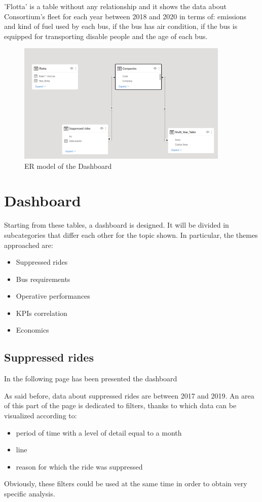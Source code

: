 'Flotta' is a table without any relationship and it shows the data about Consortium's fleet for each year between 2018 and 2020 in terms of: emissions and kind of fuel used by each bus, if the bus has air condition, if the bus is equipped for transporting disable people and the age of each bus.


\begin{figure}[h]
    \centering
    \includegraphics[width=0.9\textwidth]{Images/traditional_dashboard/ER_model.png}
    \caption{ER model of the Dashboard}
    \label{fig:ER}
\end{figure}
\section{Dashboard}

Starting from these tables, a dashboard is designed. It will be divided in subcategories that differ each other for the topic shown. In particular, the themes approached are:
\begin{itemize}
\item Suppressed rides
\item Bus requirements
\item Operative performances
\item KPIs correlation
\item Economics
\end{itemize}
\subsection{Suppressed rides}
In the following page has been presented the dashboard
\newpage
\begin{landscape}
\thispagestyle{empty}

\end{landscape}
\newpage
As said before, data about suppressed rides are between 2017 and 2019. An area of this part of the page is dedicated to filters, thanks to which data can be visualized according to:
\begin{itemize}
\item  period of time with a level of detail equal to a month
\item line
\item reason for which the ride was suppressed
\end{itemize}
Obviously, these filters could be used at the same time in order to obtain very specific analysis.

